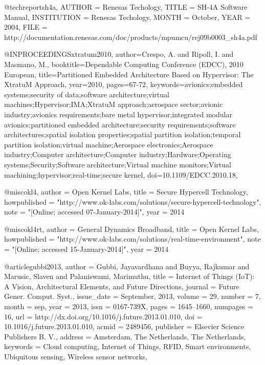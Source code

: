 @techreport{sh4a,
  AUTHOR =        {{Renesas Techology}},
  TITLE =         {SH-4A Software Manual},
  INSTITUTION =   {Renesas Techology},
  MONTH =         {October},
  YEAR  =         {2004},
  FILE  =         {http://documentation.renesas.com/doc/products/mpumcu/rej09b0003_sh4a.pdf}
}

@INPROCEEDINGS{xtratum2010, 
author={Crespo, A. and Ripoll, I. and Masmano, M.}, 
booktitle={Dependable Computing Conference (EDCC), 2010 European}, 
title={Partitioned Embedded Architecture Based on Hypervisor: The XtratuM Approach}, 
year={2010}, 
pages={67-72}, 
keywords={avionics;embedded systems;security of data;software architecture;virtual machines;Hypervisor;IMA;XtratuM approach;aerospace sector;avionic industry;avionics requirements;bare metal hypervisor;integrated modular avionics;partitioned embedded architecture;security requirements;software architectures;spatial isolation properties;spatial partition isolation;temporal partition isolation;virtual machine;Aerospace electronics;Aerospace industry;Computer architecture;Computer industry;Hardware;Operating systems;Security;Software architecture;Virtual machine monitors;Virtual machining;hypervisor;real-time;secure kernel}, 
doi={10.1109/EDCC.2010.18},}

@misc{okl4,
  author = {Open Kernel Labs},
  title = {Secure Hypercell Technology},
  howpublished = "http://www.ok-labs.com/solutions/secure-hypercell-technology",
  note = "[Online; accessed 07-January-2014]",
  year = 2014
}

@misc{okl4rt,
  author = {General Dynamics Broadband},
  title = {Open Kernel Labs},
  howpublished = "http://www.ok-labs.com/solutions/real-time-environment",
  note = "[Online; accessed 15-January-2014]",
  year = 2014
}

@article{gubbi2013,
 author = {Gubbi, Jayavardhana and Buyya, Rajkumar and Marusic, Slaven and Palaniswami, Marimuthu},
 title = {Internet of Things (IoT): A Vision, Architectural Elements, and Future Directions},
 journal = {Future Gener. Comput. Syst.},
 issue_date = {September, 2013},
 volume = {29},
 number = {7},
 month = sep,
 year = {2013},
 issn = {0167-739X},
 pages = {1645--1660},
 numpages = {16},
 url = {http://dx.doi.org/10.1016/j.future.2013.01.010},
 doi = {10.1016/j.future.2013.01.010},
 acmid = {2489456},
 publisher = {Elsevier Science Publishers B. V.},
 address = {Amsterdam, The Netherlands, The Netherlands},
 keywords = {Cloud computing, Internet of Things, RFID, Smart environments, Ubiquitous sensing, Wireless sensor networks},
} 

